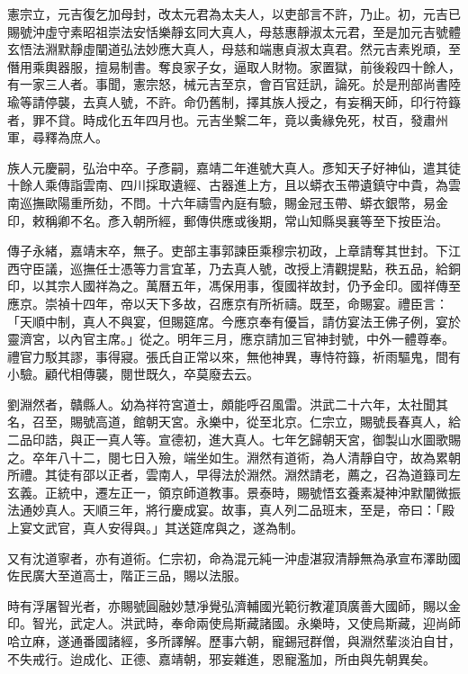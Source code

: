 \begin{pinyinscope}
憲宗立，元吉復乞加母封，改太元君為太夫人，以吏部言不許，乃止。初，元吉已賜號沖虛守素昭祖崇法安恬樂靜玄同大真人，母慈惠靜淑太元君，至是加元吉號體玄悟法淵默靜虛闡道弘法妙應大真人，母慈和端惠貞淑太真君。然元吉素兇頑，至僭用乘輿器服，擅易制書。奪良家子女，逼取人財物。家置獄，前後殺四十餘人，有一家三人者。事聞，憲宗怒，械元吉至京，會百官廷訊，論死。於是刑部尚書陸瑜等請停襲，去真人號，不許。命仍舊制，擇其族人授之，有妄稱天師，印行符籙者，罪不貸。時成化五年四月也。元吉坐繫二年，竟以夤緣免死，杖百，發肅州軍，尋釋為庶人。

族人元慶嗣，弘治中卒。子彥嗣，嘉靖二年進號大真人。彥知天子好神仙，遣其徒十餘人乘傳詣雲南、四川採取遺經、古器進上方，且以蟒衣玉帶遺鎮守中貴，為雲南巡撫歐陽重所劾，不問。十六年禱雪內庭有驗，賜金冠玉帶、蟒衣銀幣，易金印，敕稱卿不名。彥入朝所經，郵傳供應或後期，常山知縣吳襄等至下按臣治。

傳子永緒，嘉靖末卒，無子。吏部主事郭諫臣乘穆宗初政，上章請奪其世封。下江西守臣議，巡撫任士憑等力言宜革，乃去真人號，改授上清觀提點，秩五品，給銅印，以其宗人國祥為之。萬曆五年，馮保用事，復國祥故封，仍予金印。國祥傳至應京。崇禎十四年，帝以天下多故，召應京有所祈禱。既至，命賜宴。禮臣言：「天順中制，真人不與宴，但賜筵席。今應京奉有優旨，請仿宴法王佛子例，宴於靈濟宮，以內官主席。」從之。明年三月，應京請加三官神封號，中外一體尊奉。禮官力駁其謬，事得寢。張氏自正常以來，無他神異，專恃符籙，祈雨驅鬼，間有小驗。顧代相傳襲，閱世既久，卒莫廢去云。

劉淵然者，贛縣人。幼為祥符宮道士，頗能呼召風雷。洪武二十六年，太社聞其名，召至，賜號高道，館朝天宮。永樂中，從至北京。仁宗立，賜號長春真人，給二品印誥，與正一真人等。宣德初，進大真人。七年乞歸朝天宮，御製山水圖歌賜之。卒年八十二，閱七日入殮，端坐如生。淵然有道術，為人清靜自守，故為累朝所禮。其徒有邵以正者，雲南人，早得法於淵然。淵然請老，薦之，召為道籙司左玄義。正統中，遷左正一，領京師道教事。景泰時，賜號悟玄養素凝神沖默闡微振法通妙真人。天順三年，將行慶成宴。故事，真人列二品班末，至是，帝曰：「殿上宴文武官，真人安得與。」其送筵席與之，遂為制。

又有沈道寧者，亦有道術。仁宗初，命為混元純一沖虛湛寂清靜無為承宣布澤助國佐民廣大至道高士，階正三品，賜以法服。

時有浮屠智光者，亦賜號圓融妙慧凈覺弘濟輔國光範衍教灌頂廣善大國師，賜以金印。智光，武定人。洪武時，奉命兩使烏斯藏諸國。永樂時，又使烏斯藏，迎尚師哈立麻，遂通番國諸經，多所譯解。歷事六朝，寵錫冠群僧，與淵然輩淡泊自甘，不失戒行。迨成化、正德、嘉靖朝，邪妄雜進，恩寵濫加，所由與先朝異矣。


\end{pinyinscope}